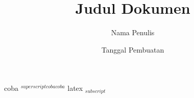 \documentclass [a4paper,12pt] {report}
\begin{document}
\title{Judul Dokumen}
\author{Nama Penulis}
\date{Tanggal Pembuatan}


coba $^{superscript  
 coba    coba}  $
latex $_{subscript}$
\end{document}
